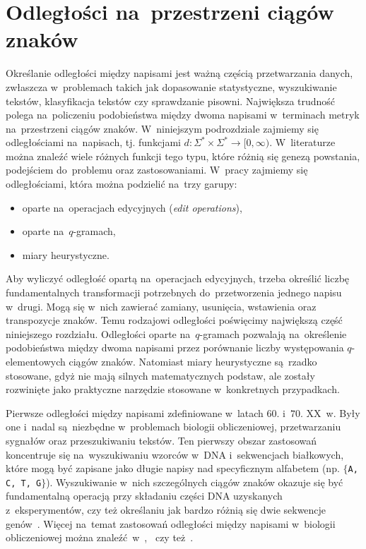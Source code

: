 \documentclass{praca1}
\begin{document}



\section{Odległości na~przestrzeni ciągów znaków}

Określanie odległości między napisami jest ważną częścią przetwarzania danych, zwłaszcza w~problemach takich jak dopasowanie statystyczne, wyszukiwanie tekstów, klasyfikacja tekstów czy sprawdzanie pisowni. Największa trudność polega na~policzeniu podobieństwa między dwoma napisami w~terminach metryk na~przestrzeni ciągów znaków.  W~niniejszym podrozdziale zajmiemy się odległościami na~napisach, tj. funkcjami $d: \Sigma^* \times \Sigma^* \rightarrow [0, \infty)$. W~literaturze można znaleźć wiele różnych funkcji tego typu, które różnią się genezą powstania, podejściem do~problemu oraz zastosowaniami. W~pracy zajmiemy się odległościami, która można podzielić na~trzy garupy:
\begin{itemize}
\item oparte na~operacjach edycyjnych (\emph{edit operations}),
\item oparte na~$q$-gramach,
\item miary heurystyczne.
\end{itemize}


Aby wyliczyć odległość opartą na~operacjach edycyjnych, trzeba określić liczbę fundamentalnych transformacji potrzebnych do~przetworzenia jednego napisu w~drugi. Mogą się w~nich zawierać zamiany, usunięcia, wstawienia oraz transpozycje znaków. Temu rodzajowi odległości poświęcimy największą część niniejszego rozdziału. Odległości oparte na~$q$-gramach pozwalają na~określenie podobieństwa między dwoma napisami przez porównanie liczby występowania $q$-elementowych ciągów znaków. Natomiast miary heurystyczne są~rzadko stosowane, gdyż nie mają silnych matematycznych podstaw, ale zostały rozwinięte jako praktyczne narzędzie stosowane w~konkretnych przypadkach. 

Pierwsze odległości między napisami zdefiniowane w~latach $60.$ i~$70.$ XX~w. Były one i~nadal są~niezbędne w~problemach biologii obliczeniowej, przetwarzaniu sygnałów oraz przeszukiwaniu tekstów. Ten pierwszy obszar zastosowań koncentruje się na~wyszukiwaniu wzorców w~DNA i~sekwencjach białkowych, które mogą być zapisane jako długie napisy nad specyficznym alfabetem (np. $\{$\verb|A, C, T, G|$\}$). Wyszukiwanie w~nich szczególnych ciągów znaków okazuje się być fundamentalną operacją przy składaniu części DNA uzyskanych z~eksperymentów, czy też określaniu jak bardzo różnią się dwie sekwencje genów~\cite{Navarro2001:guidedtour}. Więcej na~temat zastosowań odległości między napisami w~biologii obliczeniowej można znaleźć~w~\cite{Sellers1980:evolutionary},~\cite{Needleman1970:proteins} czy też~\cite{Sankoff1983:timewarps}. 
\end{document}
